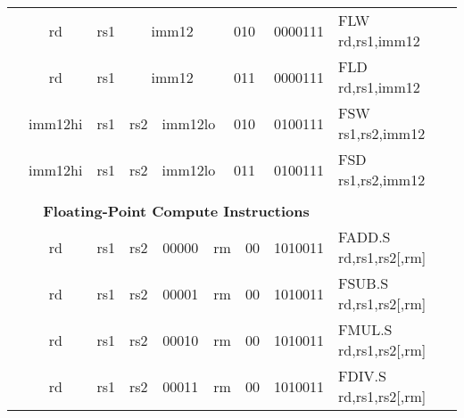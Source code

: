 \begin{table}[p]
\begin{small}
\begin{center}
\begin{tabular}{rccccccccccl}
&
\multicolumn{1}{|c|}{rd} &
\multicolumn{1}{c|}{rs1} &
\multicolumn{5}{c|}{imm12} &
\multicolumn{2}{c|}{010} &
\multicolumn{1}{c|}{0000111} & FLW rd,rs1,imm12 \\
\cline{2-11}
  

&
\multicolumn{1}{|c|}{rd} &
\multicolumn{1}{c|}{rs1} &
\multicolumn{5}{c|}{imm12} &
\multicolumn{2}{c|}{011} &
\multicolumn{1}{c|}{0000111} & FLD rd,rs1,imm12 \\
\cline{2-11}
  

&
\multicolumn{1}{|c|}{imm12hi} &
\multicolumn{1}{c|}{rs1} &
\multicolumn{1}{c|}{rs2} &
\multicolumn{4}{c|}{imm12lo} &
\multicolumn{2}{c|}{010} &
\multicolumn{1}{c|}{0100111} & FSW rs1,rs2,imm12 \\
\cline{2-11}
  

&
\multicolumn{1}{|c|}{imm12hi} &
\multicolumn{1}{c|}{rs1} &
\multicolumn{1}{c|}{rs2} &
\multicolumn{4}{c|}{imm12lo} &
\multicolumn{2}{c|}{011} &
\multicolumn{1}{c|}{0100111} & FSD rs1,rs2,imm12 \\
\cline{2-11}
  

&
\multicolumn{10}{c}{} & \\
&
\multicolumn{10}{c}{\bf Floating-Point Compute Instructions} & \\
\cline{2-11}
  

&
\multicolumn{1}{|c|}{rd} &
\multicolumn{1}{c|}{rs1} &
\multicolumn{1}{c|}{rs2} &
\multicolumn{3}{c|}{00000} &
\multicolumn{2}{c|}{rm} &
\multicolumn{1}{c|}{00} &
\multicolumn{1}{c|}{1010011} & FADD.S rd,rs1,rs2[,rm] \\
\cline{2-11}
  

&
\multicolumn{1}{|c|}{rd} &
\multicolumn{1}{c|}{rs1} &
\multicolumn{1}{c|}{rs2} &
\multicolumn{3}{c|}{00001} &
\multicolumn{2}{c|}{rm} &
\multicolumn{1}{c|}{00} &
\multicolumn{1}{c|}{1010011} & FSUB.S rd,rs1,rs2[,rm] \\
\cline{2-11}
  

&
\multicolumn{1}{|c|}{rd} &
\multicolumn{1}{c|}{rs1} &
\multicolumn{1}{c|}{rs2} &
\multicolumn{3}{c|}{00010} &
\multicolumn{2}{c|}{rm} &
\multicolumn{1}{c|}{00} &
\multicolumn{1}{c|}{1010011} & FMUL.S rd,rs1,rs2[,rm] \\
\cline{2-11}
  

&
\multicolumn{1}{|c|}{rd} &
\multicolumn{1}{c|}{rs1} &
\multicolumn{1}{c|}{rs2} &
\multicolumn{3}{c|}{00011} &
\multicolumn{2}{c|}{rm} &
\multicolumn{1}{c|}{00} &
\multicolumn{1}{c|}{1010011} & FDIV.S rd,rs1,rs2[,rm] \\
\cline{2-11}
  


\end{tabular}
\end{center}
\end{small}
\end{table}
